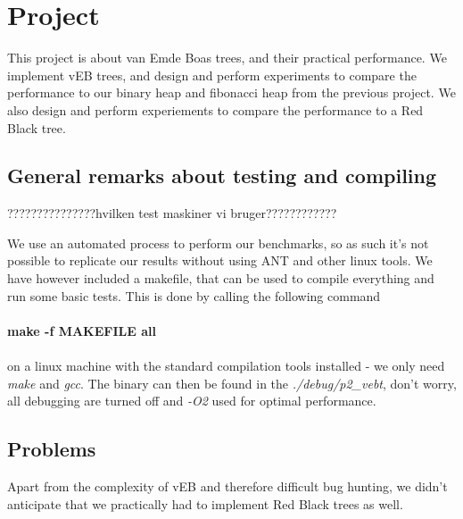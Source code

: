 \section*{Project}
This project is about van Emde Boas trees, and their practical performance. We implement vEB trees, and design and perform experiments to compare the performance to our binary heap and fibonacci heap from the previous project. We also design and perform experiements to compare the performance to a Red Black tree.

\subsection*{General remarks about testing and compiling}
???????????????hvilken test maskiner vi bruger????????????

We use an automated process to perform our benchmarks, so as such it's not possible to replicate our results without using ANT and other linux tools. We have however included a makefile, that can be used to compile everything and run some basic tests. This is done by calling the following command\\
\\
\textbf{make -f MAKEFILE all}\\
\\
on a linux machine with the standard compilation tools installed - we only need \textit{make} and \textit{gcc}. The binary can then be found in the \textit{./debug/p2\_vebt}, don't worry, all debugging are turned off and \textit{-O2} used for optimal performance.

\subsection*{Problems}
Apart from the complexity of vEB and therefore difficult bug hunting, we didn't anticipate that we practically had to implement Red Black trees as well.